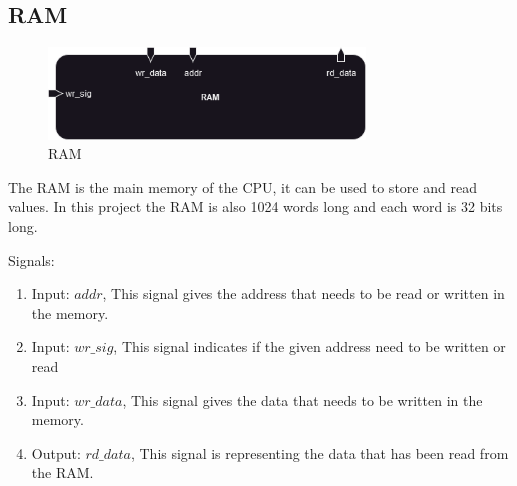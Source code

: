 \subsection{RAM}

\begin{figure}[H]
    \centering
    \includegraphics[width=0.75\textwidth]{../diagrams/rom_ram_reg/ram.png}
    \caption{RAM}
    \label{fig:ram}
\end{figure}

The RAM is the main memory of the CPU, it can be used to store and read values. In this project the RAM is also 1024 words long
and each word is 32 bits long.

Signals:
\begin{enumerate}[label={\textbullet}]
    \item Input: $addr$, This signal gives the address that needs to be read or written in the memory.
    \item Input: $wr\_sig$, This signal indicates if the given address need to be written or read
    \item Input: $wr\_data$, This signal gives the data that needs to be written in the memory.
    \item Output: $rd\_data$, This signal is representing the data that has been read from the RAM.
\end{enumerate}